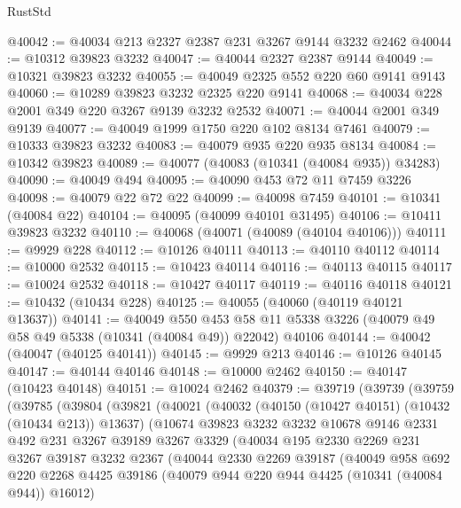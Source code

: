\begin{lexlean}{RustStd}
\begin{coremodule}
@40042 := @40034 @213 @2327 @2387 @231 @3267 @9144 @3232 @2462
@40044 := @10312 @39823 @3232
@40047 := @40044 @2327 @2387 @9144
@40049 := @10321 @39823 @3232
@40055 := @40049 @2325 @552 @220 @60 @9141 @9143
@40060 := @10289 @39823 @3232 @2325 @220 @9141
@40068 := @40034 @228 @2001 @349 @220 @3267 @9139 @3232 @2532
@40071 := @40044 @2001 @349 @9139
@40077 := @40049 @1999 @1750 @220 @102 @8134 @7461
@40079 := @10333 @39823 @3232
@40083 := @40079 @935 @220 @935 @8134
@40084 := @10342 @39823
@40089 := @40077 (@40083 (@10341 (@40084 @935)) @34283)
@40090 := @40049 @494
@40095 := @40090 @453 @72 @11 @7459 @3226
@40098 := @40079 @22 @72 @22
@40099 := @40098 @7459
@40101 := @10341 (@40084 @22)
@40104 := @40095 (@40099 @40101 @31495)
@40106 := @10411 @39823 @3232
@40110 := @40068 (@40071 (@40089 (@40104 @40106)))
@40111 := @9929 @228
@40112 := @10126 @40111
@40113 := @40110 @40112
@40114 := @10000 @2532
@40115 := @10423 @40114
@40116 := @40113 @40115
@40117 := @10024 @2532
@40118 := @10427 @40117
@40119 := @40116 @40118
@40121 := @10432 (@10434 @228)
@40125 := @40055 (@40060 (@40119 @40121 @13637))
@40141 := @40049
    @550
    @453
    @58
    @11
    @5338
    @3226
    (@40079 @49 @58 @49 @5338 (@10341 (@40084 @49)) @22042)
    @40106
@40144 := @40042 (@40047 (@40125 @40141))
@40145 := @9929 @213
@40146 := @10126 @40145
@40147 := @40144 @40146
@40148 := @10000 @2462
@40150 := @40147 (@10423 @40148)
@40151 := @10024 @2462
@40379 := @39719
    (@39739
      (@39759
        (@39785
          (@39804
            (@39821
              (@40021
                (@40032
                  (@40150 (@10427 @40151) (@10432 (@10434 @213)) @13637)
                  (@10674
                    @39823
                    @3232
                    @3232
                    @10678
                    @9146
                    @2331
                    @492
                    @231
                    @3267
                    @39189
                    @3267
                    @3329
                    (@40034
                      @195
                      @2330
                      @2269
                      @231
                      @3267
                      @39187
                      @3232
                      @2367
                      (@40044
                        @2330
                        @2269
                        @39187
                        (@40049
                          @958
                          @692
                          @220
                          @2268
                          @4425
                          @39186
                          (@40079 @944 @220 @944 @4425 (@10341 (@40084 @944)) @16012)

\end{coremodule}
\end{lexlean}
